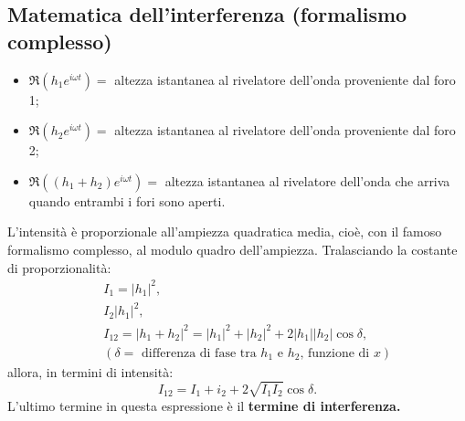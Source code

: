 \subsection*{Matematica dell'interferenza (formalismo complesso)}
\begin{itemize}
\item $\Re{\left(h_1 e^{i\omega t} \right)}=$ altezza istantanea al rivelatore dell'onda proveniente dal foro 1;
\item $\Re{\left(h_2 e^{i\omega t} \right)}=$ altezza istantanea al rivelatore dell'onda proveniente dal foro 2;
\item $\Re{\left( \left(h_1 +h_2 \right) e^{i\omega t} \right)}=$ altezza istantanea al rivelatore dell'onda che arriva quando entrambi i fori sono aperti.
\end{itemize}
L'intensità è proporzionale all'ampiezza quadratica media, cioè, con il famoso formalismo complesso, al modulo quadro dell'ampiezza. Tralasciando la costante di proporzionalità:
\begin{eqnarray}
& &I_1= \lvert {h_1} \rvert ^2, \nonumber \\
& &I_2 \lvert {h_1} \rvert ^2, \\
& &I_{12}= \lvert {h_1+h_2} \rvert ^2= \lvert {h_1} \rvert ^2+ \lvert {h_2} \rvert ^2 + 2 \lvert {h_1} \rvert \lvert {h_2} \rvert \cos \delta ,\nonumber  \\ 
& &\left( \delta = \textrm{ differenza di fase tra } h_1 \textrm{ e } h_2 \textrm{, funzione di }x \right)\nonumber 
\end{eqnarray}
allora, in termini di intensità:
\begin{equation}
I_{12}= I_1 + i_2 + 2 \sqrt{I_1 I_2}\cos \delta.
\end{equation}
L'ultimo termine in questa espressione è il \textbf{termine di interferenza.}
